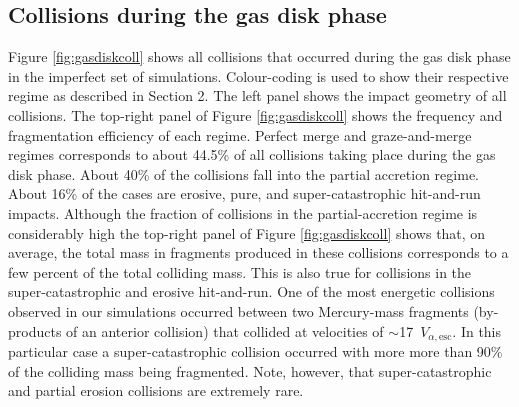 \documentclass[fleqn,usenatbib]{mnras}
\begin{document}
\subsection{Collisions during the gas disk phase}

Figure \ref{fig:gasdiskcoll} shows all collisions that occurred during the gas disk phase in the imperfect set of simulations. Colour-coding is used to show their respective regime as described in Section 2. The left panel shows the impact geometry of all collisions. The top-right panel of Figure \ref{fig:gasdiskcoll} shows the frequency and fragmentation efficiency of each regime. Perfect merge and graze-and-merge regimes corresponds to about 44.5\% of all collisions taking place during the gas disk phase. About 40\% of the collisions fall into the partial accretion regime. About 16\% of the cases are erosive, pure, and super-catastrophic hit-and-run impacts.  Although the fraction of collisions in the partial-accretion regime is considerably high the top-right panel of Figure \ref{fig:gasdiskcoll}  shows that, on average, the total mass in fragments produced in these collisions corresponds to a few percent of the total colliding mass. This is also true for collisions in the super-catastrophic and erosive hit-and-run. One of the most energetic collisions observed in our simulations occurred between two Mercury-mass fragments (by-products of an anterior collision) that collided at velocities of  $\sim$17~$V_{\alpha,\text{esc}}$. In this particular case a super-catastrophic collision occurred with more more than 90\% of the colliding mass being fragmented. Note, however, that super-catastrophic and partial erosion collisions are extremely rare.


\end{document}
